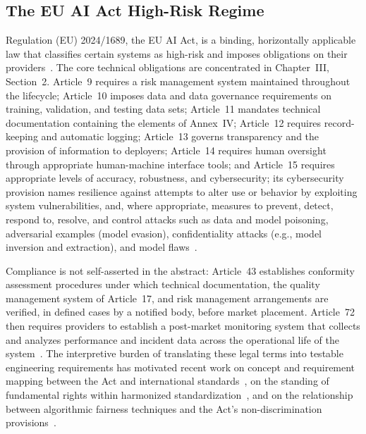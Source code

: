 \subsection{The EU AI Act High-Risk Regime}
\label{subsec:euaiact}
Regulation (EU) 2024/1689, the EU AI Act, is a binding, horizontally applicable law that classifies certain systems as high-risk and imposes obligations on their providers~\cite{euaiact2024}. The core technical obligations are concentrated in Chapter~III, Section~2. Article~9 requires a risk management system maintained throughout the lifecycle; Article~10 imposes data and data governance requirements on training, validation, and testing data sets; Article~11 mandates technical documentation containing the elements of Annex~IV; Article~12 requires record-keeping and automatic logging; Article~13 governs transparency and the provision of information to deployers; Article~14 requires human oversight through appropriate human-machine interface tools; and Article~15 requires appropriate levels of accuracy, robustness, and cybersecurity; its cybersecurity provision names resilience against attempts to alter use or behavior by exploiting system vulnerabilities, and, where appropriate, measures to prevent, detect, respond to, resolve, and control attacks such as data and model poisoning, adversarial examples (model evasion), confidentiality attacks (e.g., model inversion and extraction), and model flaws~\cite{euaiact2024}.

Compliance is not self-asserted in the abstract: Article~43 establishes conformity assessment procedures under which technical documentation, the quality management system of Article~17, and risk management arrangements are verified, in defined cases by a notified body, before market placement. Article~72 then requires providers to establish a post-market monitoring system that collects and analyzes performance and incident data across the operational life of the system~\cite{euaiact2024}. The interpretive burden of translating these legal terms into testable engineering requirements has motivated recent work on concept and requirement mapping between the Act and international standards~\cite{hernandez2024knowledgegraph,rintamaki2025ontology,lucaj2025techops}, on the standing of fundamental rights within harmonized standardization~\cite{hodac2024fundamentalrights}, and on the relationship between algorithmic fairness techniques and the Act's non-discrimination provisions~\cite{meding2025algorithmicdiscrimination}.

